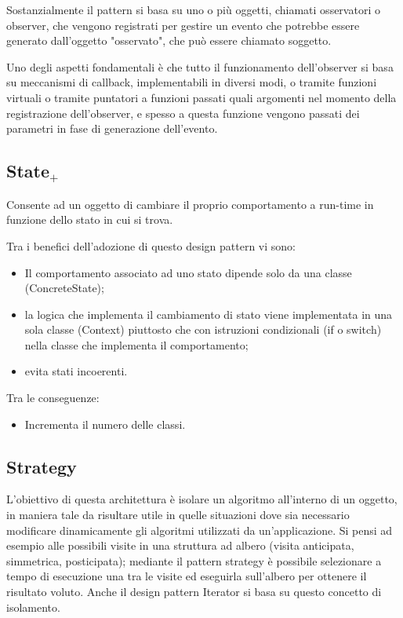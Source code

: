 Sostanzialmente il pattern si basa su uno o più oggetti, chiamati osservatori o observer, che vengono registrati per gestire un evento che potrebbe essere generato dall'oggetto "osservato", che può essere chiamato soggetto.

Uno degli aspetti fondamentali è che tutto il funzionamento dell'observer si basa su meccanismi di callback, implementabili in diversi modi, o tramite funzioni virtuali o tramite puntatori a funzioni passati quali argomenti nel momento della registrazione dell'observer, e spesso a questa funzione vengono passati dei parametri in fase di generazione dell'evento.

\subsection{State$_+$}
Consente ad un oggetto di cambiare il proprio comportamento a run-time in funzione dello stato in cui si trova.

Tra i benefici dell'adozione di questo design pattern vi sono:
\begin{itemize}
	\item Il comportamento associato ad uno stato dipende solo da una classe (ConcreteState);
	\item la logica che implementa il cambiamento di stato viene implementata in una sola classe (Context) piuttosto che con istruzioni condizionali (if o switch) nella classe che implementa il comportamento;
	\item evita stati incoerenti.
\end{itemize}
Tra le conseguenze:
\begin{itemize}
\item Incrementa il numero delle classi.
\end{itemize}

\subsection{Strategy}
L'obiettivo di questa architettura è isolare un algoritmo all'interno di un oggetto, in maniera tale da risultare utile in quelle situazioni dove sia necessario modificare dinamicamente gli algoritmi utilizzati da un'applicazione. Si pensi ad esempio alle possibili visite in una struttura ad albero (visita anticipata, simmetrica, posticipata); mediante il pattern strategy è possibile selezionare a tempo di esecuzione una tra le visite ed eseguirla sull'albero per ottenere il risultato voluto. Anche il design pattern Iterator si basa su questo concetto di isolamento.


